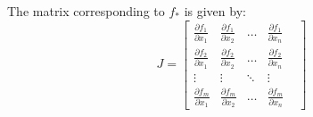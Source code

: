\documentclass{book}                                                           %
\begin{document}
                The matrix corresponding to $f_{*}$ is given by:
                \begingroup
                    \renewcommand*{\arraystretch}{1.5}
                    \begin{equation}
                        J=
                        \begin{bmatrix}
                            \frac{\partial{f}_{1}}{\partial{x}_{1}}&
                            \frac{\partial{f}_{1}}{\partial{x}_{2}}
                            &\dots&
                            \frac{\partial{f}_{1}}{\partial{x}_{n}}\\
                            \frac{\partial{f}_{2}}{\partial{x}_{1}}&
                            \frac{\partial{f}_{2}}{\partial{x}_{2}}
                            &\dots&
                            \frac{\partial{f}_{2}}{\partial{x}_{n}}\\
                            \vdots&\vdots&\ddots&\vdots&\\
                            \frac{\partial{f}_{m}}{\partial{x}_{1}}&
                            \frac{\partial{f}_{m}}{\partial{x}_{2}}
                            &\dots&
                            \frac{\partial{f}_{m}}{\partial{x}_{n}}
                        \end{bmatrix}
                    \end{equation}
                \endgroup
\end{document}
